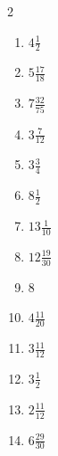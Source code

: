 \documentclass[12pt]{article}
\begin{document}
\begin{multicols}{2}
\begin{enumerate}
\item $ 4 \frac{1}{2} $
\item $ 5 \frac{17}{18} $
\item $ 7 \frac{32}{75} $
\item $ 3 \frac{7}{12} $
\item $ 3 \frac{3}{4} $
\item $ 8 \frac{1}{2} $
\item $ 13 \frac{1}{10} $
\item $ 12 \frac{19}{30} $
\item $ 8 $
\item $ 4 \frac{11}{20} $
\item $ 3 \frac{11}{12} $
\item $ 3 \frac{1}{2} $
\item $ 2 \frac{11}{12} $
\item $ 6 \frac{29}{30} $
\end{enumerate}\end{multicols}\newpage
\end{document}
